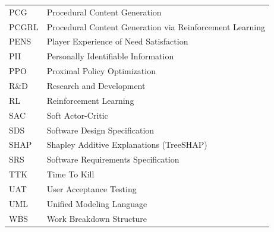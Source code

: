 \begin{longtable}{ll}
PCG & Procedural Content Generation \\
PCGRL & Procedural Content Generation via Reinforcement Learning \\
PENS & Player Experience of Need Satisfaction \\
PII & Personally Identifiable Information \\
PPO & Proximal Policy Optimization \\
R\&D & Research and Development \\
RL & Reinforcement Learning \\
SAC & Soft Actor-Critic \\
SDS & Software Design Specification \\
SHAP & Shapley Additive Explanations (TreeSHAP) \\
SRS & Software Requirements Specification \\
TTK & Time To Kill \\
UAT & User Acceptance Testing \\
UML & Unified Modeling Language \\
WBS & Work Breakdown Structure \\
\bottomrule
\end{longtable}
